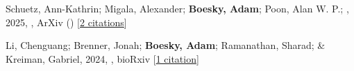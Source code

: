 \item[{\color{numcolor}\scriptsize2}] Schuetz, Ann-Kathrin; Migala, Alexander; \textbf{Boesky, Adam}; Poon, Alan W. P.; \etal, 2025, , ArXiv () [\href{https://ui.adsabs.harvard.edu/abs/2025arXiv250600757S}{2 citations}]

\item[{\color{numcolor}\scriptsize1}] Li, Chenguang; Brenner, Jonah; \textbf{Boesky, Adam}; Ramanathan, Sharad; \& Kreiman, Gabriel, 2024, , bioRxiv [\href{https://scholar.google.com/citations?view_op=view_citation&hl=en&user=8cQgOIIAAAAJ&sortby=title&citation_for_view=8cQgOIIAAAAJ:9yKSN-GCB0IC}{1 citation}]